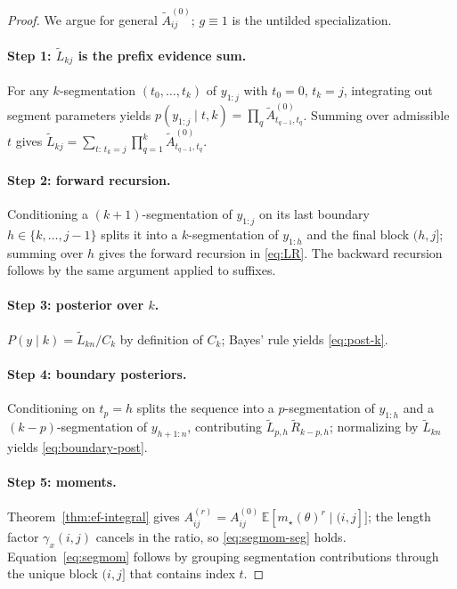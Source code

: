 \begin{proof}
We argue for general $\widetilde{A}^{(0)}_{ij}$; $g\equiv 1$ is the untilded specialization.

\paragraph{Step 1: $\widetilde{L}_{k j}$ is the prefix evidence sum.}
For any $k$-segmentation $(t_0,\dots,t_k)$ of $y_{1:j}$ with $t_0=0$, $t_k=j$, integrating out
segment parameters yields $p(y_{1:j}\mid t,k)=\prod_{q}\widetilde{A}^{(0)}_{t_{q-1},t_q}$.
Summing over admissible $t$ gives
$\widetilde{L}_{k j}=\sum_{t:\,t_k=j}\prod_{q=1}^k \widetilde{A}^{(0)}_{t_{q-1},t_q}$.

\paragraph{Step 2: forward recursion.}
Conditioning a $(k{+}1)$-segmentation of $y_{1:j}$ on its last boundary $h\in\{k,\dots,j-1\}$
splits it into a $k$-segmentation of $y_{1:h}$ and the final block $(h,j]$; summing over $h$
gives the forward recursion in \eqref{eq:LR}. The backward recursion follows by the same
argument applied to suffixes.

\paragraph{Step 3: posterior over $k$.}
$P(y\mid k)=\widetilde{L}_{k n}/C_k$ by definition of $C_k$; Bayes' rule yields \eqref{eq:post-k}.

\paragraph{Step 4: boundary posteriors.}
Conditioning on $t_p=h$ splits the sequence into a $p$-segmentation of $y_{1:h}$ and a
$(k{-}p)$-segmentation of $y_{h+1:n}$, contributing
$\widetilde{L}_{p,h}\,\widetilde{R}_{k-p,h}$; normalizing by $\widetilde{L}_{k n}$ yields
\eqref{eq:boundary-post}.

\paragraph{Step 5: moments.}
Theorem~\ref{thm:ef-integral} gives $A^{(r)}_{ij}=A^{(0)}_{ij}\,\mathbb{E}[m_\star(\theta)^r\mid(i,j]]$;
the length factor $\gamma_x(i,j)$ cancels in the ratio, so \eqref{eq:segmom-seg} holds.
Equation~\eqref{eq:segmom} follows by grouping segmentation contributions through the unique
block $(i,j]$ that contains index $t$.
\end{proof}

